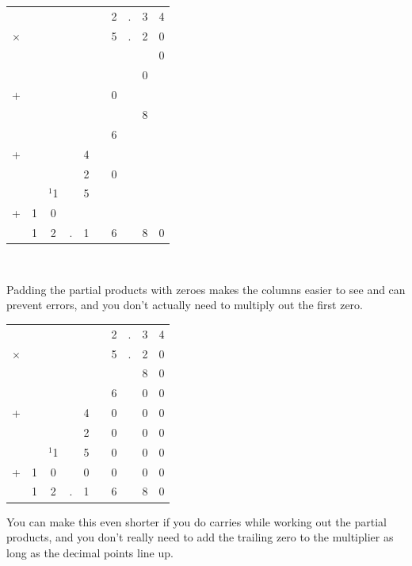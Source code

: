 \documentclass[12pt]{article}
\begin{document}
\begin{enumerate}
\begin{center}
\begin{tabular}{c@{\,}c@{\,}c@{\,}c@{\,}c@{\,}c@{\,}c@{\,}c@{\,}c@{\,}c}
       & & & & & &2&.&3&4\\
$\times$ & & & & & &5&.&2&0\\
\hline
       & & & & & & & & &0\\
       & & & & & & & &0& \\
+      & & & & & &0& & & \\
\hline
       & & & & & & & &8& \\
       & & & & & &6& & & \\
+      & & & &4& & & & & \\
\hline
       & & & &2& &0& & & \\
   & &$^{1}$1& &5& & & & & \\
+      &1&0& & & & & & & \\
\hline
       &1&2&.&1& &6& &8&0\\
\hline
\hline
\end{tabular}\\
\end{center}

Padding the partial products with zeroes makes the columns easier to see and can prevent errors, and you don't actually need to multiply out the first zero.

\begin{center}
\begin{tabular}{c@{\,}c@{\,}c@{\,}c@{\,}c@{\,}c@{\,}c@{\,}c@{\,}c@{\,}c}
         & & & & & &2&.&3&4\\
$\times$ & & & & & &5&.&2&0\\
\hline
         & & & & & & & &8&0\\
         & & & & & &6& &0&0\\
+        & & & &4& &0& &0&0\\
\hline
         & & & &2& &0& &0&0\\
   & &$^{1}$1& &5& &0& &0&0\\
+        &1&0& &0& &0& &0&0\\
\hline
       &1&2&.&1& &6& &8&0\\
\hline
\hline
\end{tabular}
\end{center}

\vspace{32pt}
You can make this even shorter if you do carries while working out the partial products, and you don't really need to add the trailing zero to the multiplier as long as the decimal points line up.


\end{enumerate}
\end{document}
